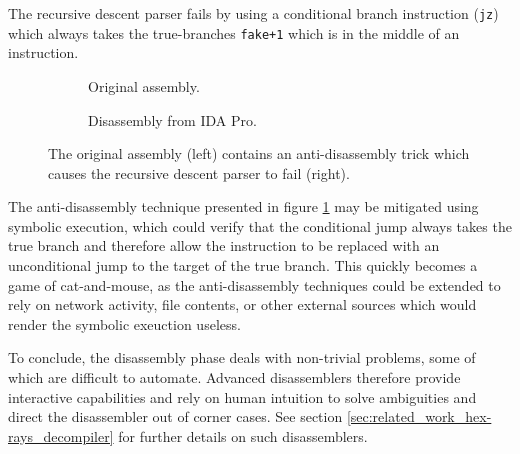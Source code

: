 The recursive descent parser fails by using a conditional branch instruction (\texttt{jz}) which always takes the true-branches \texttt{fake+1} which is in the middle of an instruction.

\begin{figure}[htbp]
	\centering
	\begin{subfigure}[t]{0.59\textwidth}
		
		\caption{Original assembly.}
	\end{subfigure}
	\qquad
	\begin{subfigure}[t]{0.34\textwidth}
		
		\caption{Disassembly from IDA Pro.}
	\end{subfigure}
	\caption{The original assembly (left) contains an anti-disassembly trick which causes the recursive descent parser to fail (right).}
	\label{fig:anti-disassembly}
\end{figure}

The anti-disassembly technique presented in figure \ref{fig:anti-disassembly} may be mitigated using symbolic execution, which could verify that the conditional jump always takes the true branch and therefore allow the instruction to be replaced with an unconditional jump to the target of the true branch. This quickly becomes a game of cat-and-mouse, as the anti-disassembly techniques could be extended to rely on network activity, file contents, or other external sources which would render the symbolic exeuction useless.

To conclude, the disassembly phase deals with non-trivial problems, some of which are difficult to automate. Advanced disassemblers therefore provide interactive capabilities and rely on human intuition to solve ambiguities and direct the disassembler out of corner cases. See section \ref{sec:related_work_hex-rays_decompiler} for further details on such disassemblers.

%
%
%
